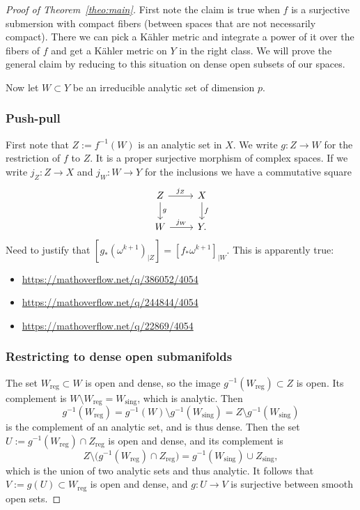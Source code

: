 \documentclass[11pt]{amsart}
\theoremstyle{definition}
\begin{document}
\begin{proof}[Proof of Theorem~\ref{theo:main}]
First note the claim is true when $f$ is a surjective submersion with compact fibers (between spaces that are not necessarily compact).
There we can pick a K\"ahler metric and integrate a power of it over the fibers of $f$ and get a K\"ahler metric on $Y$ in the right class.
We will prove the general claim by reducing to this situation on dense open subsets of our spaces.

Now let $W \subset Y$ be an irreducible analytic set of dimension $p$.

\subsubsection*{Push-pull}

First note that $Z := f^{-1}(W)$ is an analytic set in $X$.
We write $g : Z \to W$ for the restriction of $f$ to $Z$.
It is a proper surjective morphism of complex spaces.
If we write $j_Z : Z \to X$ and $j_W : W \to Y$ for the inclusions we have a commutative square
\[
\begin{tikzcd}
Z \ar[r,"j_Z"] \ar[d,"g"] &
X \ar[d,"f"]
\\
W \ar[r,"j_W"] &
Y.
\end{tikzcd}
\]
Need to justify that $[g_*(\omega^{k+1})_{|Z}] = [f_*\omega^{k+1}]_{|W}$.
This is apparently true:
\begin{itemize}
\item
\url{https://mathoverflow.net/q/386052/4054}

\item
\url{https://mathoverflow.net/q/244844/4054}

\item
\url{https://mathoverflow.net/q/22869/4054}
\end{itemize}


\subsubsection*{Restricting to dense open submanifolds}

The set $W_{\text{reg}} \subset W$ is open and dense, so the image $g^{-1}(W_{\text{reg}}) \subset Z$ is open.
Its complement is $W \setminus W_{\text{reg}} = W_{\text{sing}}$, which is analytic.
Then 
\[
g^{-1}(W_{\text{reg}}) 
= g^{-1}(W) \setminus g^{-1}(W_{\text{sing}})
= Z \setminus g^{-1}(W_{\text{sing}})
\]
is the complement of an analytic set, and is thus dense.
Then the set $U := g^{-1}(W_{\text{reg}}) \cap Z_{\text{reg}}$ is open and dense, and its complement is
\[
Z \setminus \bigl( g^{-1}(W_{\text{reg}}) \cap Z_{\text{reg}} \bigr)
= g^{-1}(W_{\text{sing}})
\cup Z_{\text{sing}},
\]
which is the union of two analytic sets and thus analytic.
It follows that $V := g(U) \subset W_{\text{reg}}$ is open and dense, and $g : U \to V$ is surjective between smooth open sets.


\end{proof}
\end{document}
